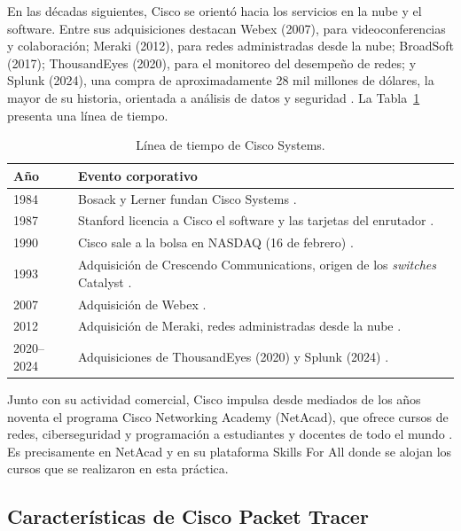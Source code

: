En las décadas siguientes, Cisco se orientó hacia los servicios en la nube y el software. Entre sus adquisiciones destacan Webex (2007), para videoconferencias y colaboración; Meraki (2012), para redes administradas desde la nube; BroadSoft (2017); ThousandEyes (2020), para el monitoreo del desempeño de redes; y Splunk (2024), una compra de aproximadamente 28 mil millones de dólares, la mayor de su historia, orientada a análisis de datos y seguridad \cite{ebsco:cisco-systems}. La Tabla~\ref{tab:prac04:cisco} presenta una línea de tiempo.

\begin{table}[H]
    \centering
    \renewcommand{\arraystretch}{1.3}
    \begin{tabular}{|p{2.6cm}|p{12.2cm}|}
        \hline
        \textbf{Año} & \textbf{Evento corporativo} \\ \hline
        1984 & Bosack y Lerner fundan Cisco Systems \cite{wikipedia:cisco-systems}. \\ \hline
        1987 & Stanford licencia a Cisco el software y las tarjetas del enrutador \cite{wikipedia:cisco-systems}. \\ \hline
        1990 & Cisco sale a la bolsa en NASDAQ (16 de febrero) \cite{wikipedia:cisco-systems}. \\ \hline
        1993 & Adquisición de Crescendo Communications, origen de los \emph{switches} Catalyst \cite{wikipedia:cisco-systems}. \\ \hline
        2007 & Adquisición de Webex \cite{wikipedia:cisco-systems}. \\ \hline
        2012 & Adquisición de Meraki, redes administradas desde la nube \cite{ebsco:cisco-systems}. \\ \hline
        2020--2024 & Adquisiciones de ThousandEyes (2020) y Splunk (2024) \cite{ebsco:cisco-systems}. \\ \hline
    \end{tabular}
    \caption{Línea de tiempo de Cisco Systems.}
    \label{tab:prac04:cisco}
\end{table}

Junto con su actividad comercial, Cisco impulsa desde mediados de los años noventa el programa Cisco Networking Academy (NetAcad), que ofrece cursos de redes, ciberseguridad y programación a estudiantes y docentes de todo el mundo \cite{cisco:frezzo-blog}. Es precisamente en NetAcad y en su plataforma Skills For All donde se alojan los cursos que se realizaron en esta práctica.

\subsection{Características de Cisco Packet Tracer}
\label{sec:prac04:packet-tracer}

